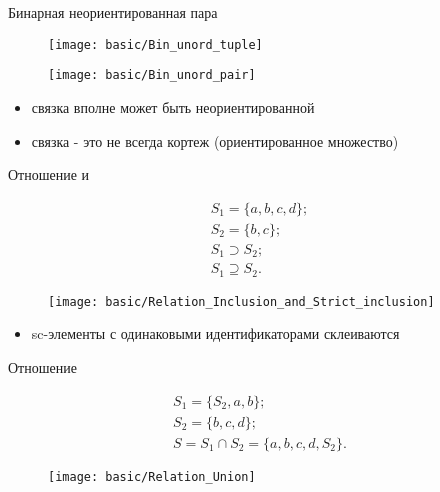 \begin{frame}{Бинарная неориентированная пара}
  \begin{center}
    \begin{figure}
      \texttt{[image: basic/Bin\_unord\_tuple]}
    \end{figure}

    \objeqv

    \begin{figure}
      \texttt{[image: basic/Bin\_unord\_pair]}
    \end{figure}
  \end{center}

  \begin{itemize}
  \item связка вполне может быть неориентированной
  \item связка - это не всегда кортеж (ориентированное множество)
  \end{itemize}
\end{frame}

\begin{frame}[shrink=10]{Отношение  и }
  \begin{center}
    \begin{eqnarray*}
      S_1 = \{ a, b, c, d \}; \\
      S_2 = \{ b, c \}; \\
      S_1 \supset S_2; \\
      S_1 \supseteq S_2.
    \end{eqnarray*}

    \objeqv

    \begin{figure}
      \texttt{[image: basic/Relation\_Inclusion\_and\_Strict\_inclusion]}
    \end{figure}
  \end{center}

  \begin{itemize}
  \item sc-элементы с одинаковыми идентификаторами склеиваются
  \end{itemize}
\end{frame}

\begin{frame}[shrink=10]{Отношение }
  \begin{center}
    \begin{eqnarray*}
      S_1 = \{ S_2, a, b \}; \\
      S_2 = \{ b, c, d \}; \\
      S = S_1 \cap S_2 = \{ a, b, c, d, S_2 \}.
    \end{eqnarray*}

    \objeqv

    \begin{figure}
      \texttt{[image: basic/Relation\_Union]}
    \end{figure}
  \end{center}
\end{frame}

